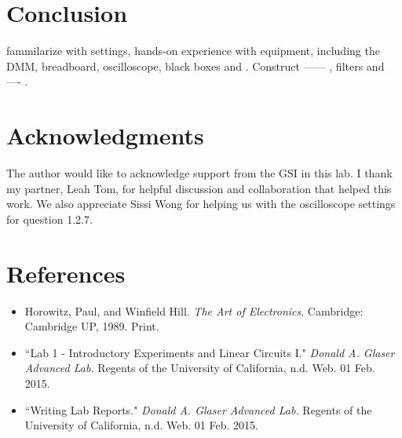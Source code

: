 \documentclass[authoryear, 12pt,5p, times]{elsarticle}
\begin{document}
 \section{Conclusion}

fammilarize with settings, hands-on experience with equipment, including the DMM, breadboard, oscilloscope, black boxes and . Construct ------ , filters and ---- . 
\section*{Acknowledgments}
\begin{footnotesize}
The author would  like to acknowledge support from the GSI in this lab. I thank my partner, Leah Tom, for helpful discussion and collaboration that helped this work. We also appreciate Sissi Wong for helping us with the oscilloscope settings for question 1.2.7.
\end{footnotesize}
  \section*{References}
 \begin{footnotesize}
 \begin{itemize}
 \item Horowitz, Paul, and Winfield Hill. \textit{The Art of Electronics}. Cambridge: Cambridge UP, 1989. Print.
 \item ``Lab 1 - Introductory Experiments and Linear Circuits I." \textit{Donald A. Glaser Advanced Lab.} Regents of the University of California, n.d. Web. 01 Feb. 2015.
  \item ``Writing Lab Reports." \textit{Donald A. Glaser Advanced Lab.} Regents of the University of California, n.d. Web. 01 Feb. 2015.
\end{itemize}
% 
%
  \end{footnotesize}
\end{document}
